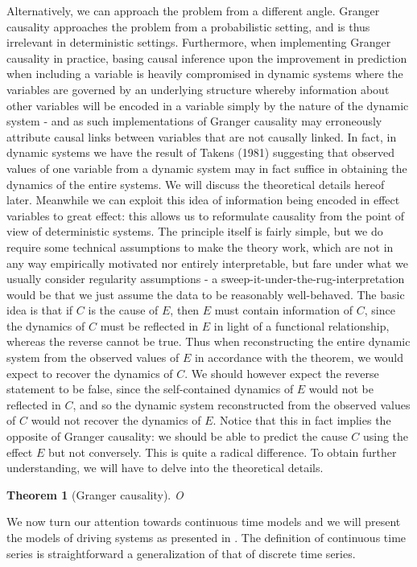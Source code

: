 \documentclass[11pt, a4paper]{memoir}
\theoremstyle{break}
\newtheorem{thm}{Theorem}
\theoremstyle{break}
\theoremstyle{nonumberplain}
\begin{document}
Alternatively, we can approach the problem from a different angle. Granger causality approaches the problem from a probabilistic setting, and is thus irrelevant in deterministic settings. Furthermore, when implementing Granger causality in practice, basing causal inference upon the improvement in prediction when including a variable is heavily compromised in dynamic systems where the variables are governed by an underlying structure whereby information about other variables will be encoded in a variable simply by the nature of the dynamic system - and as such implementations of Granger causality may erroneously attribute causal links between variables that are not causally linked. In fact, in dynamic systems we have the result of Takens (1981) suggesting that observed values of one variable from a dynamic system may in fact suffice in obtaining the dynamics of the entire systems. We will discuss the theoretical details hereof later. Meanwhile we can exploit this idea of information being encoded in effect variables to great effect: this allows us to reformulate causality from the point of view of deterministic systems. The principle itself is fairly simple, but we do require some technical assumptions to make the theory work, which are not in any way empirically motivated nor entirely interpretable, but fare under what we usually consider regularity assumptions - a sweep-it-under-the-rug-interpretation would be that we just assume the data to be reasonably well-behaved. The basic idea is that if $C$ is the cause of $E$, then $E$ must contain information of $C$, since the dynamics of $C$ must be reflected in $E$ in light of a functional relationship, whereas the reverse cannot be true. Thus when reconstructing the entire dynamic system from the observed values of $E$ in accordance with the theorem, we would expect to recover the dynamics of $C$. We should however expect the reverse statement to be false, since the self-contained dynamics of $E$ would not be reflected in $C$, and so the dynamic system reconstructed from the observed values of $C$ would not recover the dynamics of $E$. Notice that this in fact implies the opposite of Granger causality: we should be able to predict the cause $C$ using the effect $E$ but not conversely. This is quite a radical difference. To obtain further understanding, we will have to delve into the theoretical details. 
\begin{thm}[Granger causality]
O
\end{thm}
We now turn our attention towards continuous time models and we will present the models of driving systems as presented in \cite{mathFound}. The definition of continuous time series is straightforward a generalization of that of discrete time series.
\end{document}
